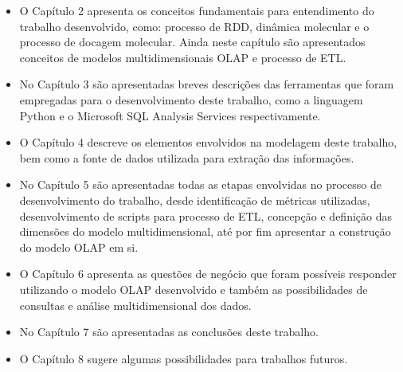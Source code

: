 \begin{itemize} 
	\item O Capítulo 2 apresenta os conceitos fundamentais para entendimento do trabalho desenvolvido, como: processo de RDD, dinâmica molecular e o processo de docagem molecular. Ainda neste capítulo são apresentados conceitos de modelos multidimensionais OLAP e processo de ETL.
	\item No Capítulo 3 são apresentadas breves descrições das ferramentas que foram empregadas para o desenvolvimento deste trabalho, como a linguagem Python e o Microsoft SQL Analysis Services respectivamente.
	\item O Capítulo 4 descreve os elementos envolvidos na modelagem deste trabalho, bem como a fonte de dados utilizada para extração das informações.
	\item No Capítulo 5 são apresentadas todas as etapas envolvidas no processo de desenvolvimento do trabalho, desde identificação de métricas utilizadas, desenvolvimento de scripts para processo de ETL, concepção e definição das dimensões do modelo multidimensional, até por fim apresentar a construção do modelo OLAP em si.
	\item O Capítulo 6 apresenta as questões de negócio que foram possíveis responder utilizando o modelo OLAP desenvolvido e também as possibilidades de consultas e análise multidimensional dos dados.
	\item No Capítulo 7 são apresentadas as conclusões deste trabalho.
	\item O Capítulo 8 sugere algumas possibilidades para trabalhos futuros.
\end{itemize} 